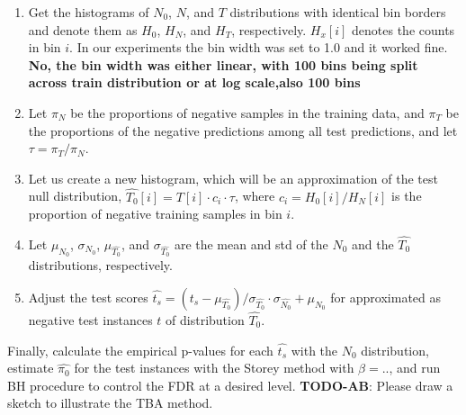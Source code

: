 \documentclass{article}
\newcommand{\todo}[2]{{\color{red} {\bf TODO-#1}: #2}}
\begin{document}
\begin{enumerate}%
	\itemsep-3pt  		
	\item Get the histograms of $N_0$, $N$, and $T$ distributions with identical bin borders and denote them as $H_0$, $H_N$, and $H_T$, respectively. $H_x[i]$ denotes the counts in bin $i$.  In our experiments the bin width was set to 1.0 and it worked fine. \textbf{No, the bin width was either linear, with 100 bins being split across train distribution or at log scale,also 100 bins}
	
	\item Let $\pi_N$ be the proportions of negative samples in the training data, and $\pi_T$ be the proportions of the negative predictions among all test predictions, and let $\tau=\pi_T/\pi_N$. 
	
	\item Let us create a new histogram, which will be an approximation of the test null distribution, $\hat{T_0}[i]=T[i]\cdot c_i\cdot \tau$, where $c_i=H_0[i]/H_N[i]$ is the proportion of negative training samples in bin $i$.
	
	\item Let $\mu_{N_0}$, $\sigma_{N_0}$, $\mu_{\hat{T_0}}$, and $\sigma_{\hat{T_0}}$ are the mean and std of the $N_0$ and the $\hat{T_0}$ distributions, respectively. 
	
	\item Adjust the test scores $\hat{t_s} = (t_s-\mu_{\hat{T_0}})/\sigma_{\hat{T_0}} \cdot \sigma_{\hat{N_0}} + \mu_{N_0}$ for approximated as negative test instances $t$ of distribution $\hat{T_0}$.
\end{enumerate}


	Finally, calculate the empirical p-values for each $\hat{t_s}$ with the $N_0$ distribution, estimate  $\hat{\pi_0}$ for the test instances with the Storey method with $\beta= ..$, and run BH procedure to control the FDR at a desired level. \todo{AB}{Please draw a sketch to illustrate the TBA method.}
	
	
	
%	
%	
	
\end{document}

